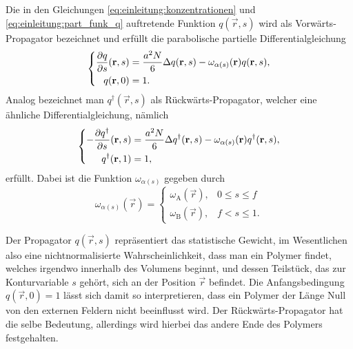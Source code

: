 Die in den Gleichungen \eqref{eq:einleitung:konzentrationen} und \eqref{eq:einleitung:part_funk_q} auftretende Funktion $q(\vec{r}, s)$ wird als Vorwärts-Propagator bezeichnet und erfüllt die parabolische partielle Differentialgleichung
\begin{equation}
\label{eq:einleitung:fpropagator}
\noeqref{eq:einleitung:fpropagator}
    \left\{
    \begin{aligned}
        \frac{\partial q}{\partial s}(\vec{r}, s) &= \frac{a^{2}N}{6} \Delta q(\vec{r}, s) - \omega_{\alpha(s)}(\vec{r}) q(\vec{r}, s),\\
        q(\vec{r}, 0) &= 1.
    \end{aligned}
    \right.
\end{equation}%
Analog bezeichnet man $q^{\dagger}(\vec{r}, s)$ als Rückwärts-Propagator, welcher eine ähnliche Differentialgleichung, nämlich
\begin{equation}
\label{eq:einleitung:bpropagator}
\noeqref{eq:einleitung:bpropagator}
    \left\{
    \begin{aligned}
        -\frac{\partial q^{\dagger}}{\partial s}(\vec{r}, s) &= \frac{a^{2}N}{6} \Delta q^{\dagger}(\vec{r}, s) - \omega_{\alpha(s)}(\vec{r}) q^{\dagger}(\vec{r}, s),\\
        q^{\dagger}(\vec{r}, 1) &= 1,
    \end{aligned}
    \right.
\end{equation}%
erfüllt.
Dabei ist die Funktion $\omega_{\alpha(s)}$ gegeben durch
\begin{equation}
    \omega_{\alpha(s)}(\vec{r}) = \begin{cases}
        \omega_{\mathrm{A}}(\vec{r}), & 0 \leq s \leq f\\
        \omega_{\mathrm{B}}(\vec{r}), & f < s \leq 1.
    \end{cases}
\end{equation}

Der Propagator $q(\vec{r}, s)$ repräsentiert das statistische Gewicht, im Wesentlichen also eine nichtnormalisierte Wahrscheinlichkeit, dass man ein Polymer findet, welches irgendwo innerhalb des Volumens beginnt, und dessen Teilstück, das zur Konturvariable $s$ gehört, sich an der Position $\vec{r}$ befindet.
Die Anfangsbedingung $q(\vec{r}, 0) = 1$ lässt sich damit so interpretieren, dass ein Polymer der Länge Null von den externen Feldern nicht beeinflusst wird.
Der Rückwärts-Propagator hat die selbe Bedeutung, allerdings wird hierbei das andere Ende des Polymers festgehalten.

